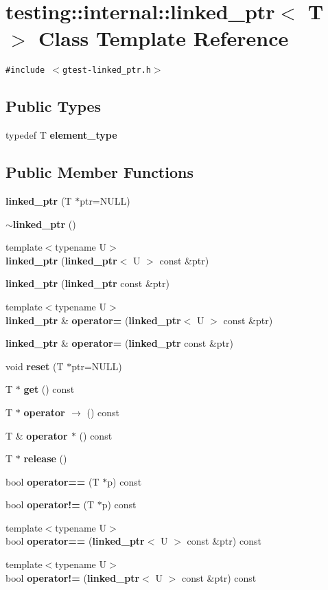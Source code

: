 \section{testing::internal::linked\_\-ptr$<$ T $>$ Class Template Reference}
\label{classtesting_1_1internal_1_1linked__ptr}
{\tt \#include $<$gtest-linked\_\-ptr.h$>$}

\subsection*{Public Types}
\begin{CompactItemize}
\item 
typedef T {\bf element\_\-type}
\end{CompactItemize}
\subsection*{Public Member Functions}
\begin{CompactItemize}
\item 
{\bf linked\_\-ptr} (T $\ast$ptr=NULL)
\item 
{\bf $\sim$linked\_\-ptr} ()
\item 
{\footnotesize template$<$typename U$>$ }\\{\bf linked\_\-ptr} ({\bf linked\_\-ptr}$<$ U $>$ const \&ptr)
\item 
{\bf linked\_\-ptr} ({\bf linked\_\-ptr} const \&ptr)
\item 
{\footnotesize template$<$typename U$>$ }\\{\bf linked\_\-ptr} \& {\bf operator=} ({\bf linked\_\-ptr}$<$ U $>$ const \&ptr)
\item 
{\bf linked\_\-ptr} \& {\bf operator=} ({\bf linked\_\-ptr} const \&ptr)
\item 
void {\bf reset} (T $\ast$ptr=NULL)
\item 
T $\ast$ {\bf get} () const
\item 
T $\ast$ {\bf operator $\rightarrow$ } () const
\item 
T \& {\bf operator $\ast$} () const
\item 
T $\ast$ {\bf release} ()
\item 
bool {\bf operator==} (T $\ast$p) const
\item 
bool {\bf operator!=} (T $\ast$p) const
\item 
{\footnotesize template$<$typename U$>$ }\\bool {\bf operator==} ({\bf linked\_\-ptr}$<$ U $>$ const \&ptr) const
\item 
{\footnotesize template$<$typename U$>$ }\\bool {\bf operator!=} ({\bf linked\_\-ptr}$<$ U $>$ const \&ptr) const
\end{CompactItemize}
